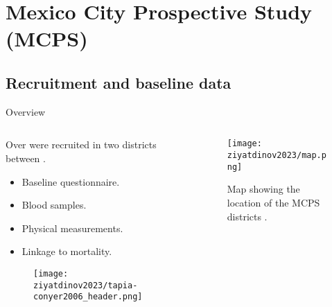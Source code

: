 \section{Mexico City Prospective Study (MCPS)}

\subsection{Recruitment and baseline data}

\begin{frame}{Overview}
    \begin{columns}
        \begin{column}{0.45\textwidth}
            Over  were recruited in two districts between .
            \begin{itemize}
                \item Baseline questionnaire.
                \item Blood samples.
                \item Physical measurements.
                \item Linkage to mortality.
            \end{itemize}
            \begin{figure}[htpb]
                \centering
                \texttt{[image: ziyatdinov2023/tapia-conyer2006\_header.png]}
            \end{figure}

        \end{column}
        \begin{column}{0.45\textwidth}
            \begin{figure}[htpb]
                \centering
                \texttt{[image: ziyatdinov2023/map.png]}
                \caption{Map showing the location of the MCPS districts \parencite{tapia-conyer-2006}.}
                \label{fig:mcps-main-map}
            \end{figure}
        \end{column}
    \end{columns}
\end{frame}

